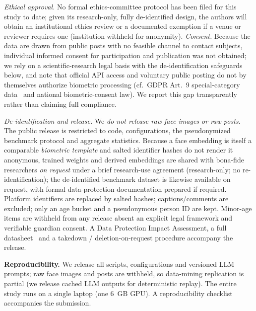 \documentclass[letterpaper]{article} %
\begin{document}
\emph{Ethical approval.} No formal ethics-committee protocol has been filed for this study to date; given its research-only, fully de-identified design, the authors will obtain an institutional ethics review or a documented exemption if a venue or reviewer requires one (institution withheld for anonymity). \emph{Consent.} Because the data are drawn from public posts with no feasible channel to contact subjects, individual informed consent for participation and publication was not obtained; we rely on a scientific-research legal basis with the de-identification safeguards below, and note that official API access and voluntary public posting do not by themselves authorize biometric processing (cf.\ GDPR Art.~9 special-category data~\cite{gdpr2016} and national biometric-consent law). We report this gap transparently rather than claiming full compliance.

\emph{De-identification and release.} We \emph{do not release raw face images or raw posts}. The public release is restricted to code, configurations, the pseudonymized benchmark protocol and aggregate statistics. Because a face embedding is itself a comparable \emph{biometric template} and salted identifier hashes do not render it anonymous, trained weights and derived embeddings are shared with bona-fide researchers \emph{on request} under a brief research-use agreement (research-only; no re-identification); the de-identified benchmark dataset is likewise available on request, with formal data-protection documentation prepared if required. Platform identifiers are replaced by salted hashes; captions/comments are excluded; only an age bucket and a pseudonymous person ID are kept. Minor-age items are withheld from any release absent an explicit legal framework and verifiable guardian consent. A Data Protection Impact Assessment, a full datasheet~\cite{gebru2021datasheets} and a takedown / deletion-on-request procedure accompany the release.

\textbf{Reproducibility.} We release all scripts, configurations and versioned LLM prompts; raw face images and posts are withheld, so data-mining replication is partial (we release cached LLM outputs for deterministic replay). The entire study runs on a single laptop (one 6~GB GPU). A reproducibility checklist accompanies the submission.


\end{document}
